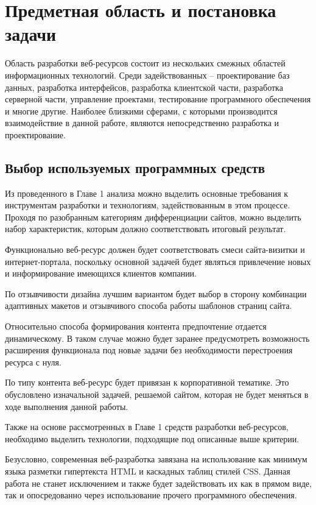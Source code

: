 \section{Предметная область и постановка задачи}

Область разработки веб-ресурсов состоит из нескольких смежных областей информационных технологий.
Среди задействованных -- проектирование баз данных, разработка интерфейсов, разработка клиентской части, разработка серверной части, управление проектами, тестирование программного обеспечения и многие другие.
Наиболее близкими сферами, с которыми производится взаимодействие в данной работе, являются непосредственно разработка и проектирование.

\subsection{Выбор используемых программных средств}

Из проведенного в Главе 1 анализа можно выделить основные требования к инструментам разработки и технологиям, задействованным в этом процессе.
Проходя по разобранным категориям дифференциации сайтов, можно выделить набор характеристик, которым должно соответствовать итоговый результат.

Функционально веб-ресурс должен будет соответствовать смеси сайта-визитки и интернет-портала, поскольку основной задачей будет являться привлечение новых и информирование имеющихся клиентов компании.

По отзывчивости дизайна лучшим вариантом будет выбор в сторону комбинации адаптивных макетов и отзывчивого способа работы шаблонов страниц сайта.

Относительно способа формирования контента предпочтение отдается динамическому.
В таком случае можно будет заранее предусмотреть возможность расширения функционала под новые задачи без необходимости перестроения ресурса с нуля.

По типу контента веб-ресурс будет привязан к корпоративной тематике.
Это обусловлено изначальной задачей, решаемой сайтом, которая не будет меняться в ходе выполнения данной работы.

Также на основе рассмотренных в Главе 1 средств разработки веб-ресурсов, необходимо выделить технологии, подходящие под описанные выше критерии.

Безусловно, современная веб-разработка завязана на использование как минимум языка разметки гипертекста HTML и каскадных таблиц стилей CSS.
Данная работа не станет исключением и также будет задействовать их как в прямом виде, так и опосредованно через использование прочего программного обеспечения.

